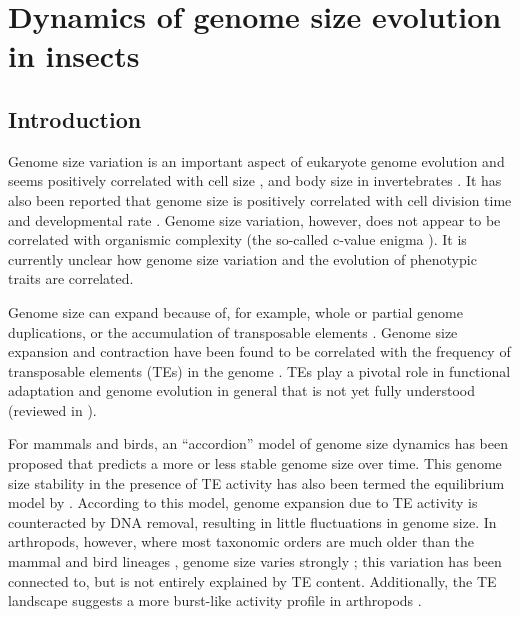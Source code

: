 
\chapter{Dynamics of genome size evolution in insects}
\label{cha:dynamics}

\section{Introduction}

Genome size variation is an important aspect of eukaryote genome
evolution \citep{Gregory2005,Petrov2001} and seems positively correlated with cell
size \citep{Dufresne2011}, and body size in invertebrates
\citep{Gregory2008}. It has also been reported that genome size is
positively correlated with cell division time \citep{Bennett1977} and
developmental rate \citep{White2000}. Genome size variation, however,
does not appear to be correlated with organismic complexity (the
so-called c-value enigma \citep{Gregory2008}). It is currently unclear
how genome size variation and the evolution of phenotypic traits are
correlated.

Genome size can expand because of, for example, whole or partial genome
duplications, or the accumulation of transposable elements
\citep{Bennetzen2005,Piegu2006,Vitte2007,Kelly2015,Nystedt2013,Blass2012,Neafsey2003,Sun2012,Sato2010,Marburger2018,Kapusta2017a}. Genome size expansion and contraction have been
found to be correlated with the frequency of transposable elements (TEs)
in the genome \citep{Sotero-Caio2017,Kapusta2017a,Petrov1996,Petrov2000}. TEs play a pivotal role in functional
adaptation and genome evolution in general that is not yet fully
understood (reviewed in \citet{Maumus2015,Arkhipova2018}).

For mammals and birds, an ``accordion'' model of genome size dynamics
has been proposed \citet{Kapusta2017a} that predicts a more or less
stable genome size over time. This genome size stability in the presence
of TE activity has also been termed the equilibrium model by
\citet{Charlesworth1983}. According to this model, genome expansion due to TE
activity is counteracted by DNA removal, resulting in little
fluctuations in genome size. In arthropods, however, where most
taxonomic orders are much older than the mammal and bird lineages
\citep{Misof2014}, genome size varies strongly \citep{Alfsnes2017,Petersen2019};
this variation has been connected to, but is not entirely explained by
TE content. Additionally, the TE landscape suggests a more burst-like
activity profile in arthropods \citep{Petersen2019}.

